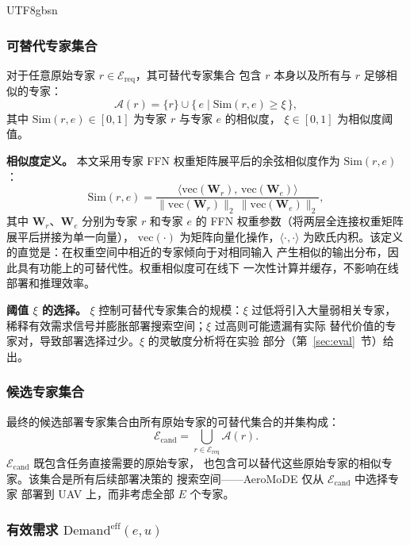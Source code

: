 \documentclass[conference]{IEEEtran}
\begin{document}
\begin{CJK*}{UTF8}{gbsn}
\subsubsection{可替代专家集合}

对于任意原始专家 $r\in\mathcal{E}_{\mathrm{req}}$，其可替代专家集合
包含 $r$ 本身以及所有与 $r$ 足够相似的专家：
\begin{equation}
\mathcal{A}(r) = \{r\} \cup \{\,e \mid \mathrm{Sim}(r,e) \ge \xi\,\},
\label{eq:ar}
\end{equation}
其中 $\mathrm{Sim}(r,e)\in[0,1]$ 为专家 $r$ 与专家 $e$ 的相似度，
$\xi\in[0,1]$ 为相似度阈值。

\textbf{相似度定义。}
本文采用专家 FFN 权重矩阵展平后的余弦相似度作为 $\mathrm{Sim}(r,e)$：
\begin{equation}
\mathrm{Sim}(r,e) =
\frac{\bigl\langle \mathrm{vec}(\mathbf{W}_r),\,
                \mathrm{vec}(\mathbf{W}_e) \bigr\rangle}
     {\|\mathrm{vec}(\mathbf{W}_r)\|_2\,
      \|\mathrm{vec}(\mathbf{W}_e)\|_2},
\label{eq:sim}
\end{equation}
其中 $\mathbf{W}_r$、$\mathbf{W}_e$ 分别为专家 $r$ 和专家 $e$ 的 FFN
权重参数（将两层全连接权重矩阵展平后拼接为单一向量），
$\mathrm{vec}(\cdot)$ 为矩阵向量化操作，$\langle\cdot,\cdot\rangle$
为欧氏内积。该定义的直觉是：在权重空间中相近的专家倾向于对相同输入
产生相似的输出分布，因此具有功能上的可替代性。权重相似度可在线下
一次性计算并缓存，不影响在线部署和推理效率。

\textbf{阈值 $\xi$ 的选择。}
$\xi$ 控制可替代专家集合的规模：$\xi$ 过低将引入大量弱相关专家，
稀释有效需求信号并膨胀部署搜索空间；$\xi$ 过高则可能遗漏有实际
替代价值的专家对，导致部署选择过少。$\xi$ 的灵敏度分析将在实验
部分（第~\ref{sec:eval}~节）给出。

\subsubsection{候选专家集合}

最终的候选部署专家集合由所有原始专家的可替代集合的并集构成：
\begin{equation}
\mathcal{E}_{\mathrm{cand}} = \bigcup_{r\in\mathcal{E}_{\mathrm{req}}}
\mathcal{A}(r).
\label{eq:ecand}
\end{equation}
$\mathcal{E}_{\mathrm{cand}}$ 既包含任务直接需要的原始专家，
也包含可以替代这些原始专家的相似专家。该集合是所有后续部署决策的
搜索空间——AeroMoDE 仅从 $\mathcal{E}_{\mathrm{cand}}$ 中选择专家
部署到 UAV 上，而非考虑全部 $E$ 个专家。

\subsubsection{有效需求 \texorpdfstring{$\mathrm{Demand}^{\mathrm{eff}}(e,u)$}{Demand\_eff(e,u)}}


\end{CJK*}
\end{document}
